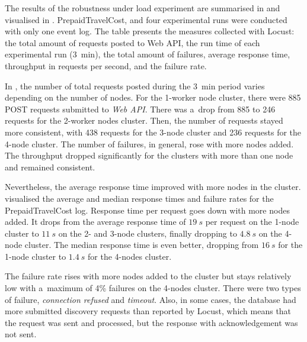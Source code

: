 \documentclass[12pt]{article}
\begin{document}
The results of the robustness under load experiment are summarised in  and visualised in . PrepaidTravelCost, and four experimental runs were conducted with only one event log. The table presents the measures collected with Locust: the total amount of requests posted to Web API, the run time of each experimental run (3~min), the total amount of failures, average response time, throughput in requests per second, and the failure rate.

In , the number of total requests posted during the 3~min period varies depending on the number of nodes. For the 1-worker node cluster, there were 885 POST requests submitted to \emph{Web API}. There was a~drop from 885 to 246 requests for the 2-worker nodes cluster. Then, the number of requests stayed more consistent, with 438 requests for the 3-node cluster and 236 requests for the 4-node cluster. The number of failures, in general, rose with more nodes added. The throughput dropped significantly for the clusters with more than one node and remained consistent. 

Nevertheless, the average response time improved with more nodes in the cluster.  visualised the average and median response times and failure rates for the PrepaidTravelCost log. Response time per request goes down with more nodes added. It drops from the average response time of $19~s$ per request on the 1-node cluster to $11~s$ on the 2- and 3-node clusters, finally dropping to $4.8~s$ on the 4-node cluster. The median response time is even better, dropping from $16~s$ for the 1-node cluster to $1.4~s$ for the 4-nodes cluster.

The failure rate rises with more nodes added to the cluster but stays relatively low with a~maximum of 4\% failures on the 4-nodes cluster. There were two types of failure, \emph{connection refused} and \emph{timeout}. Also, in some cases, the database had more submitted discovery requests than reported by Locust, which means that the request was sent and processed, but the response with acknowledgement was not sent.
\end{document}
